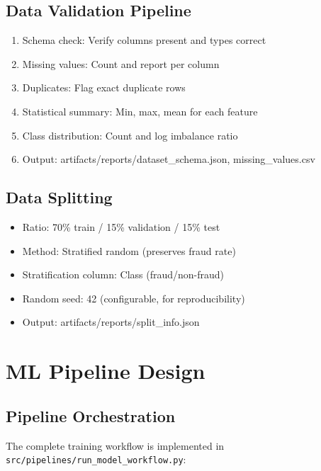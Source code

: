 \documentclass[12pt,a4paper]{article}
\newcommand{\code}[1]{\texttt{#1}}
\begin{document}
\subsection{Data Validation Pipeline}
\begin{enumerate}
    \item Schema check: Verify columns present and types correct
    \item Missing values: Count and report per column
    \item Duplicates: Flag exact duplicate rows
    \item Statistical summary: Min, max, mean for each feature
    \item Class distribution: Count and log imbalance ratio
    \item Output: artifacts/reports/dataset\_schema.json, missing\_values.csv
\end{enumerate}

\subsection{Data Splitting}
\begin{itemize}
    \item Ratio: 70\% train / 15\% validation / 15\% test
    \item Method: Stratified random (preserves fraud rate)
    \item Stratification column: Class (fraud/non-fraud)
    \item Random seed: 42 (configurable, for reproducibility)
    \item Output: artifacts/reports/split\_info.json
\end{itemize}

\section{ML Pipeline Design}

\subsection{Pipeline Orchestration}

The complete training workflow is implemented in \code{src/pipelines/run\_model\_workflow.py}:
\end{document}

